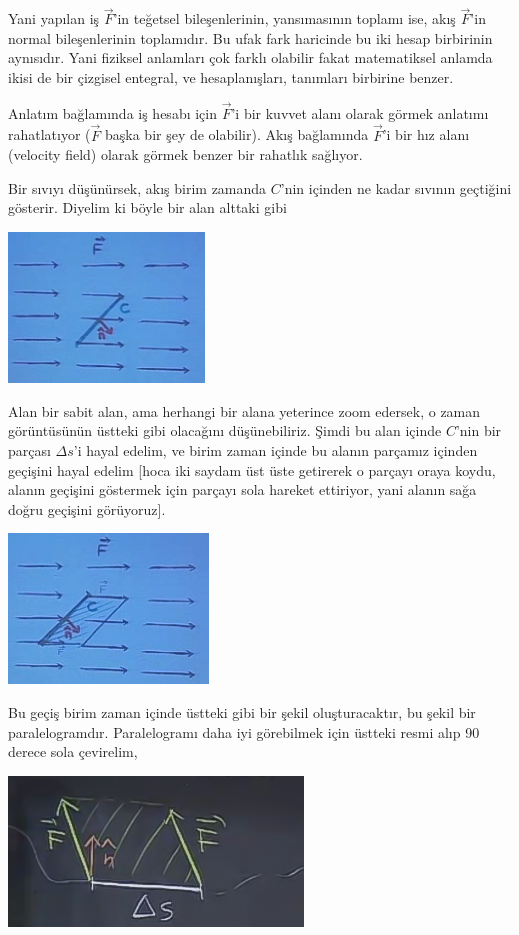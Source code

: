 \documentclass[12pt,fleqn]{article}\usepackage{../../common}
\begin{document}
Yani yapılan iş $\vec{F}$'in teğetsel bileşenlerinin, yansımasının toplamı
ise, akış $\vec{F}$'in normal bileşenlerinin toplamıdır. Bu ufak fark
haricinde bu iki hesap birbirinin aynısıdır. Yani fiziksel anlamları çok
farklı olabilir fakat matematiksel anlamda ikisi de bir çizgisel entegral,
ve hesaplanışları, tanımları birbirine benzer. 

Anlatım bağlamında iş hesabı için $\vec{F}$'i bir kuvvet alanı olarak görmek
anlatımı rahatlatıyor ($\vec{F}$ başka bir şey de olabilir). Akış
bağlamında $\vec{F}$'i bir hız alanı (velocity field) olarak görmek
benzer bir rahatlık sağlıyor. 

Bir sıvıyı düşünürsek, akış birim zamanda $C$'nin içinden ne kadar sıvının
geçtiğini gösterir. Diyelim ki böyle bir alan alttaki gibi

\includegraphics[height=4cm]{23_3.png}

Alan bir sabit alan, ama herhangi bir alana yeterince zoom edersek, o zaman
görüntüsünün üstteki gibi olacağını düşünebiliriz. Şimdi bu alan içinde
$C$'nin bir parçası $\Delta s$'i hayal edelim, ve birim zaman içinde bu
alanın parçamız içinden geçişini hayal edelim [hoca iki saydam üst üste
getirerek o parçayı oraya koydu, alanın geçişini göstermek için parçayı
sola hareket ettiriyor, yani alanın sağa doğru geçişini görüyoruz].

\includegraphics[height=4cm]{23_4.png}

Bu geçiş birim zaman içinde üstteki gibi bir şekil oluşturacaktır, bu
şekil bir paralelogramdır. Paralelogramı daha iyi görebilmek için üstteki
resmi alıp 90 derece sola çevirelim, 

\includegraphics[height=4cm]{23_5.png}
\end{document}

